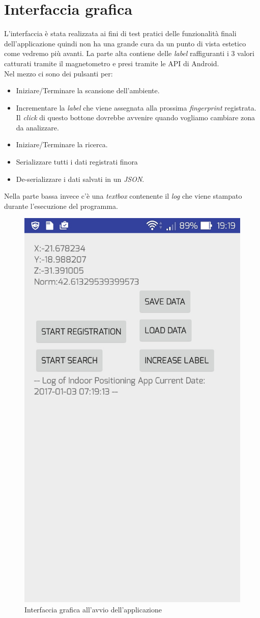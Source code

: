 \section{Interfaccia grafica}
L'interfaccia \`e stata realizzata ai fini di test pratici delle funzionalit\`a finali dell'applicazione quindi non ha una grande cura da un punto di vista estetico come vedremo pi\`u  avanti.
La parte alta contiene delle \textit{label} raffiguranti i 3 valori catturati tramite il magnetometro e presi tramite le API di Android. \\
Nel mezzo ci sono dei pulsanti per:
\begin{itemize}
	\item Iniziare/Terminare la scansione dell'ambiente.
	\item Incrementare la \textit{label} che viene assegnata alla prossima \textit{fingerprint} registrata. Il \textit{click} di questo bottone dovrebbe avvenire quando vogliamo cambiare zona da analizzare.
	\item Iniziare/Terminare la ricerca.
	\item Serializzare tutti i dati registrati finora
	\item De-serializzare i dati salvati in un \textit{JSON}.
\end{itemize}
Nella parte bassa invece c'\`e una \textit{textbox} contenente il \textit{log} che viene stampato durante l'esecuzione del programma.

\begin{figure}[H]
\centering
\includegraphics[width=0.4\linewidth]{img/app_screen}
\caption{Interfaccia grafica all'avvio dell'applicazione}
\label{fig:app_screen}
\end{figure}

